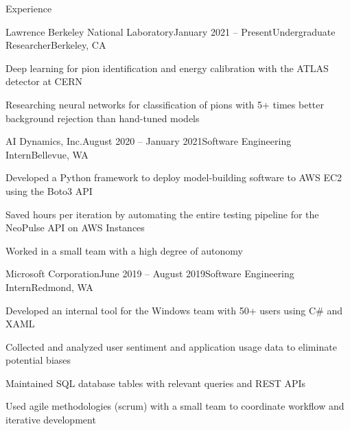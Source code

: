 \documentclass{resume} %
\begin{document}
\begin{rSection}{Experience}

\begin{rSubsection}{Lawrence Berkeley National Laboratory}{January 2021 – Present}{Undergraduate Researcher}{Berkeley, CA}
\item Deep learning for pion identification and energy calibration with the ATLAS detector at CERN
\item Researching neural networks for classification of pions with 5+ times better background rejection than hand-tuned models
\end{rSubsection}

\begin{rSubsection}{AI Dynamics, Inc.}{August 2020 – January 2021}{Software Engineering Intern}{Bellevue, WA}
\item Developed a Python framework to deploy model-building software to AWS EC2 using the Boto3 API
\item Saved hours per iteration by automating the entire testing pipeline for the NeoPulse API on AWS Instances
\item Worked in a small team with a high degree of autonomy
\end{rSubsection}

\begin{rSubsection}{Microsoft Corporation}{June 2019 – August 2019}{Software Engineering Intern}{Redmond, WA}
\item Developed an internal tool for the Windows team with 50+ users using C\# and XAML
\item Collected and analyzed user sentiment and application usage data to eliminate potential biases
\item Maintained SQL database tables with relevant queries and REST APIs
\item Used agile methodologies (scrum) with a small team to coordinate workflow and iterative development
\end{rSubsection}

\end{rSection}

\end{document}
